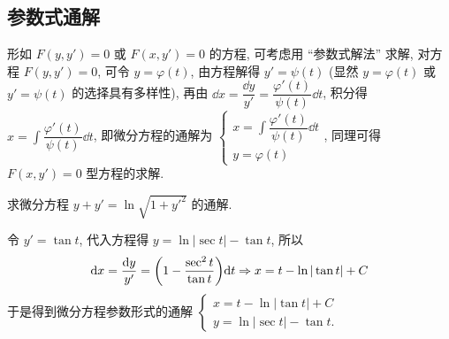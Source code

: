 \subsection{参数式通解}

形如 $F(y,y')=0$ 或 $F(x,y')=0$ 的方程, 可考虑用 “参数式解法” 求解, 对方程 $F(y,y')=0$, 可令 $y=\varphi(t)$, 由方程解得 $y'=\psi(t)$ (显然 $y=\varphi(t)$ 或 $y'=\psi(t)$ 的选择具有多样性), 再由 $\dd x=\dfrac{\dd y}{y'}=\dfrac{\varphi'(t)}{\psi(t)}\dd t$, 积分得 $\displaystyle x=\int\dfrac{\varphi'(t)}{\psi(t)}\dd t$, 
即微分方程的通解为 $\begin{cases}
    \displaystyle x=\int\dfrac{\varphi'(t)}{\psi(t)}\dd t \\ 
    y=\varphi(t)
\end{cases}$, 同理可得 $F(x,y')=0$ 型方程的求解.

\begin{example}
    求微分方程 $y+y'=\ln\sqrt{1+y'^2}$ 的通解.
\end{example}
\begin{solution}
    令 $y'=\tan t$, 代入方程得 $y=\ln|\sec t|-\tan t$, 所以 
    $$
    \dd x=\dfrac{\dd y}{y'}=\qty(1-\dfrac{\sec^2 t}{\tan t})\dd t\Rightarrow x=t-\ln|\tan t|+C
    $$
    于是得到微分方程参数形式的通解 $\begin{cases}
        x=t-\ln|\tan t|+C \\ 
        y=\ln|\sec t|-\tan t.
    \end{cases}$
\end{solution}